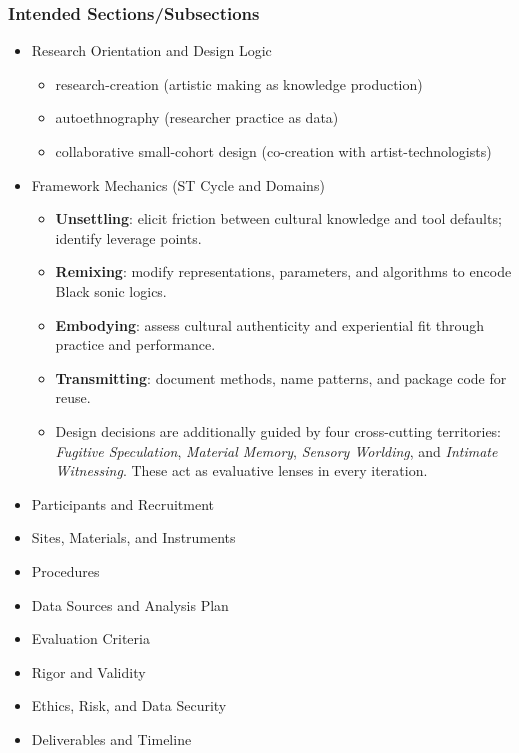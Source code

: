 \subsubsection{Intended Sections/Subsections}
\begin{itemize}[nosep]
	\item Research Orientation and Design Logic
		\begin{itemize}[nosep]
			\item research-creation (artistic making as knowledge production)
			\item autoethnography (researcher practice as data)
			\item collaborative small-cohort design (co-creation with artist-technologists)
		\end{itemize}
	\item Framework Mechanics (ST Cycle and Domains)
		\begin{itemize}[nosep]
			\item \textbf{Unsettling}: elicit friction between cultural knowledge and tool defaults; identify leverage points.
			\item \textbf{Remixing}: modify representations, parameters, and algorithms to encode Black sonic logics.
			\item \textbf{Embodying}: assess cultural authenticity and experiential fit through practice and performance.
			\item \textbf{Transmitting}: document methods, name patterns, and package code for reuse.
			\item Design decisions are additionally guided by four cross-cutting territories:
			\textit{Fugitive Speculation}, \textit{Material Memory}, \textit{Sensory Worlding}, and \textit{Intimate Witnessing}. These act as evaluative lenses in every iteration.
		\end{itemize}
	\item Participants and Recruitment
	\item Sites, Materials, and Instruments
	\item Procedures
	\item Data Sources and Analysis Plan
	\item Evaluation Criteria
	\item Rigor and Validity
	\item Ethics, Risk, and Data Security
	\item Deliverables and Timeline	
\end{itemize}


